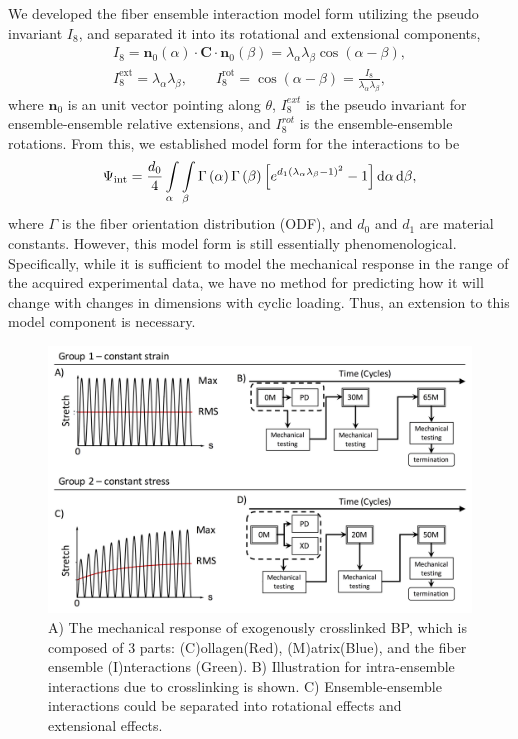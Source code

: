 	We developed the fiber ensemble interaction model form utilizing the pseudo invariant $I_8$, and separated it into its rotational and extensional components\cite{sacks_novel_2016},
\begin{equation}
\begin{gathered}
I_8 = \mathbf{n}_0\left( \alpha\right)\cdot\mathbf{C}\cdot\mathbf{n}_0\left( \beta\right) = \lambda_\alpha \lambda_\beta \cos(\alpha - \beta), \\
I_8^{\mathrm{ext}} = \lambda_\alpha \lambda_\beta, \qquad I_8^{\mathrm{rot}} = \cos(\alpha - \beta) = \frac{I_8}{\lambda_\alpha \lambda_\beta},
\end{gathered}
\end{equation}
where $\mathbf{n}_0$ is an unit vector pointing along $\theta$, $I_8^{ext}$ is the pseudo invariant for ensemble-ensemble relative extensions, and $I_8^{rot}$ is the ensemble-ensemble rotations. 
From this, we established model form for the interactions to be
\begin{equation}
\Psi_{\mathrm{int}} = \frac{d_0}{4}\int\displaylimits_\alpha \int\displaylimits_\beta \Gamma\left(\alpha\right)\Gamma \left( \beta \right)\left[ e^{d_1(\lambda_\alpha \lambda_\beta - 1)^2}-1 \right] \mathrm{d}\alpha\, \mathrm{d}\beta,
\end{equation}
where $\Gamma$ is the fiber orientation distribution (ODF), and $d_0$ and $d_1$ are material constants. 
	However, this model form is still essentially phenomenological. 
	Specifically, while it is sufficient to model the mechanical response in the range of the acquired experimental data, we have no method for predicting how it will change with changes in dimensions with cyclic loading. Thus, an extension to this model component is necessary.

\begin{figure}[hbt]
\centering
\includegraphics[width=0.5\paperwidth]{Images/chapter4/figure5}
\caption{A) The mechanical response of exogenously crosslinked BP, which is composed of 3 parts: (C)ollagen(Red), (M)atrix(Blue), and the fiber ensemble (I)nteractions (Green). B) Illustration for intra-ensemble interactions due to crosslinking is shown. C) Ensemble-ensemble interactions could be separated into rotational effects and extensional effects. }
\label{fig:EXLforms}
\end{figure}

